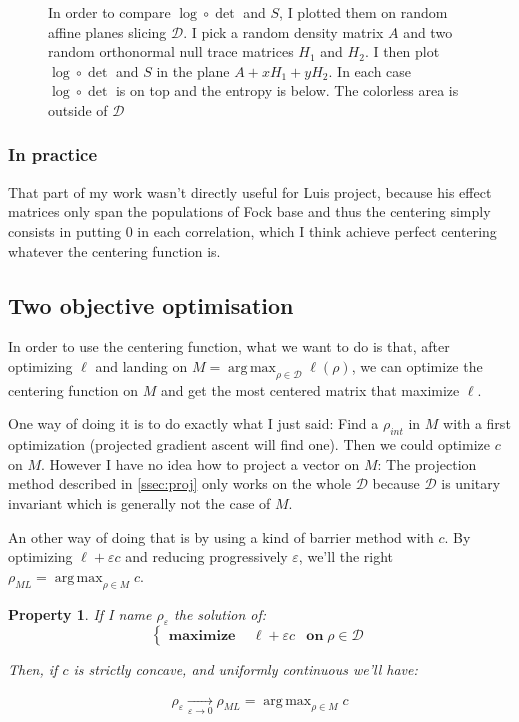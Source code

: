 \documentclass[10pt,a4paper]{report}
\theoremstyle{plain}
\newtheorem{prop}[thm]{Property}
\theoremstyle{definition}
\theoremstyle{remark}
\DeclareMathOperator{\argmax}{arg\,max}
\newcommand{\ml}{_{M\!L}}
\newcommand{\maximf}[2]{\begin{cases}
    \mathbf{maximize}\,\quad #1& \mathbf{on}\; #2
  \end{cases}}
\begin{document}
\begin{figure}
\caption{In order to compare $\log \circ \det$ and $S$, I plotted them on random affine planes
slicing $\mathcal{D}$. I pick a random density matrix $A$ and two random orthonormal null
trace matrices $H_1$ and $H_2$. I then plot $\log \circ \det$ and $S$ in the
plane $A + x H_1 + y H_2$. In each case $\log\circ \det$ is on top and the
entropy is below. The colorless area is outside of $\mathcal{D}$}
\label{fig:heat}
\end{figure}

\subsubsection{In practice}

That part of my work wasn't directly useful for Luis project, because his effect
matrices only span the populations of Fock base and thus the centering simply
consists in putting $0$ in each correlation, which I think achieve perfect centering
whatever the centering function is.

\subsection{Two objective optimisation}

In order to use the centering function, what we want to do is that, after
optimizing $\ell$ and landing on $M = \argmax_{\rho \in \mathcal{D}} \ell(\rho)$, we
can optimize the centering function on $M$ and get the most centered matrix that
maximize $\ell$.

One way of doing it is to do exactly what I just said: Find a $\rho_{int}$ in
$M$ with a first optimization (projected gradient ascent will find one).
Then we could optimize $c$ on $M$.
However I have no idea how to project a vector on $M$: The projection method
described in \cref{ssec:proj} only works on the whole $\mathcal{D}$ because
$\mathcal{D}$ is unitary invariant which is generally not the case of $M$.

An other way of doing that is by using a kind of barrier method with $c$. By optimizing $\ell +
\varepsilon c$ and reducing progressively $\varepsilon$, we'll the right
$\rho\ml = \argmax_{\rho \in M} c$.

\begin{prop}
  If I name $\rho_\varepsilon$ the solution of:
  \[\maximf{\ell + \varepsilon c}{\rho \in \mathcal{D}}\]

  Then, if $c$ is strictly concave, and uniformly continuous we'll have:

  \[ \rho_\varepsilon \xrightarrow[\varepsilon \to 0]{} \rho\ml = \argmax_{\rho \in M} c\]
\end{prop}
\end{document}
